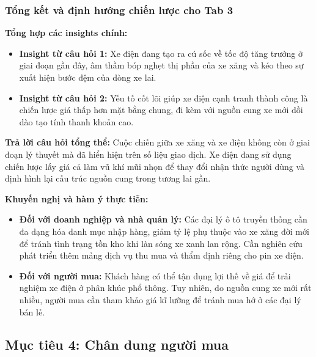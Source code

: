 \subsubsection{Tổng kết và định hướng chiến lược cho Tab 3}
\label{subsubsec:tab3_summary}

\noindent\textbf{Tổng hợp các insights chính:}
\begin{itemize}
    \item \textbf{Insight từ câu hỏi 1:} Xe điện đang tạo ra cú sốc về tốc độ tăng trưởng ở giai đoạn gần đây, âm thầm bóp nghẹt thị phần của xe xăng và kéo theo sự xuất hiện bước đệm của dòng xe lai.
    \item \textbf{Insight từ câu hỏi 2:} Yếu tố cốt lõi giúp xe điện cạnh tranh thành công là chiến lược giá thấp hơn mặt bằng chung, đi kèm với nguồn cung xe mới dồi dào tạo tính thanh khoản cao.
\end{itemize}

\noindent\textbf{Trả lời câu hỏi tổng thể:} 
Cuộc chiến giữa xe xăng và xe điện không còn ở giai đoạn lý thuyết mà đã hiển hiện trên số liệu giao dịch. Xe điện đang sử dụng chiến lược lấy giá cả làm vũ khí mũi nhọn để thay đổi nhận thức người dùng và định hình lại cấu trúc nguồn cung trong tương lai gần.

\noindent\textbf{Khuyến nghị và hàm ý thực tiễn:}
\begin{itemize}
    \item \textbf{Đối với doanh nghiệp và nhà quản lý:} Các đại lý ô tô truyền thống cần đa dạng hóa danh mục nhập hàng, giảm tỷ lệ phụ thuộc vào xe xăng đời mới để tránh tình trạng tồn kho khi làn sóng xe xanh lan rộng. Cần nghiên cứu phát triển thêm mảng dịch vụ thu mua và thẩm định riêng cho pin xe điện.
    \item \textbf{Đối với người mua:} Khách hàng có thể tận dụng lợi thế về giá để trải nghiệm xe điện ở phân khúc phổ thông. Tuy nhiên, do nguồn cung xe mới rất nhiều, người mua cần tham khảo giá kĩ lưỡng để tránh mua hớ ở các đại lý bán lẻ.
\end{itemize}


\subsection{Mục tiêu 4: Chân dung người mua}
\label{subsec:tab[X]}

